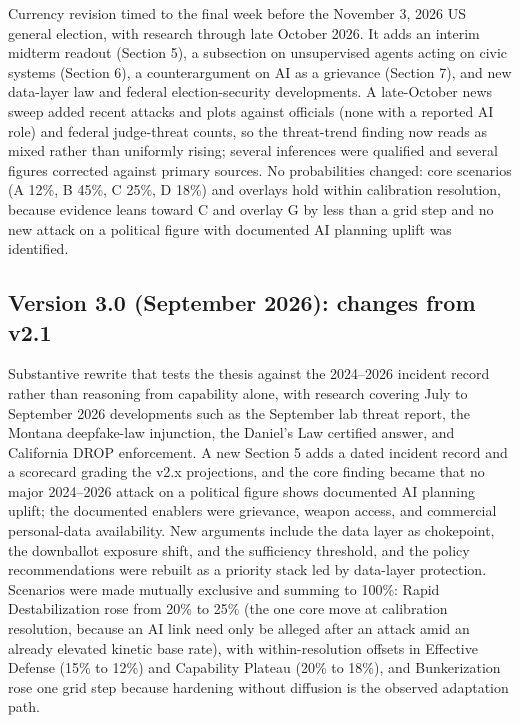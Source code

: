 \documentclass[11pt,letterpaper]{article}
\begin{document}
Currency revision timed to the final week before the November 3, 2026 US general election, with research through late October 2026. It adds an interim midterm readout (Section 5), a subsection on unsupervised agents acting on civic systems (Section 6), a counterargument on AI as a grievance (Section 7), and new data-layer law and federal election-security developments. A late-October news sweep added recent attacks and plots against officials (none with a reported AI role) and federal judge-threat counts, so the threat-trend finding now reads as mixed rather than uniformly rising; several inferences were qualified and several figures corrected against primary sources. No probabilities changed: core scenarios (A 12\%, B 45\%, C 25\%, D 18\%) and overlays hold within calibration resolution, because evidence leans toward C and overlay G by less than a grid step and no new attack on a political figure with documented AI planning uplift was identified.

\subsection*{Version 3.0 (September 2026): changes from v2.1}

Substantive rewrite that tests the thesis against the 2024--2026 incident record rather than reasoning from capability alone, with research covering July to September 2026 developments such as the September lab threat report, the Montana deepfake-law injunction, the Daniel's Law certified answer, and California DROP enforcement. A new Section 5 adds a dated incident record and a scorecard grading the v2.x projections, and the core finding became that no major 2024--2026 attack on a political figure shows documented AI planning uplift; the documented enablers were grievance, weapon access, and commercial personal-data availability. New arguments include the data layer as chokepoint, the downballot exposure shift, and the sufficiency threshold, and the policy recommendations were rebuilt as a priority stack led by data-layer protection. Scenarios were made mutually exclusive and summing to 100\%: Rapid Destabilization rose from 20\% to 25\% (the one core move at calibration resolution, because an AI link need only be alleged after an attack amid an already elevated kinetic base rate), with within-resolution offsets in Effective Defense (15\% to 12\%) and Capability Plateau (20\% to 18\%), and Bunkerization rose one grid step because hardening without diffusion is the observed adaptation path.
\end{document}
